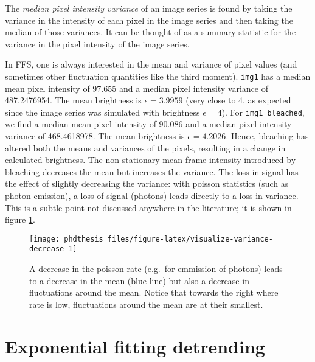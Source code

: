 \documentclass[12pt,]{book}
\theoremstyle{definition}
\theoremstyle{definition}
\theoremstyle{definition}
\theoremstyle{remark}
\let\BeginKnitrBlock\begin \let\EndKnitrBlock\end
\begin{document}
\BeginKnitrBlock{definition}[median pixel intensity variance]
\protect\hypertarget{def:unnamed-chunk-22}{}{\label{def:unnamed-chunk-22}
\iffalse (median pixel intensity variance) \fi{} }The \emph{median pixel
intensity variance} of an image series is found by taking the variance
in the intensity of each pixel in the image series and then taking the
median of those variances. It can be thought of as a summary statistic
for the variance in the pixel intensity of the image series.
\EndKnitrBlock{definition}

In FFS, one is always interested in the mean and variance of pixel
values (and sometimes other fluctuation quantities like the third
moment). \texttt{img1} has a median mean pixel intensity of 97.655 and a
median pixel intensity variance of 487.2476954. The mean brightness is
\(\epsilon = 3.9959\) (very close to 4, as expected since the image
series was simulated with brightness \(\epsilon = 4\)). For
\texttt{img1\_bleached}, we find a median mean pixel intensity of 90.086
and a median pixel intensity variance of 468.4618978. The mean
brightness is \(\epsilon = 4.2026\). Hence, bleaching has altered both
the means and variances of the pixels, resulting in a change in
calculated brightness. The non-stationary mean frame intensity
introduced by bleaching decreases the mean but increases the variance.
The loss in signal has the effect of slightly decreasing the variance:
with poisson statistics (such as photon-emission), a loss of signal
(photons) leads directly to a loss in variance. This is a subtle point
not discussed anywhere in the literature; it is shown in figure
\ref{fig:visualize-variance-decrease}.







\begin{figure}

\texttt{[image: phdthesis\_files/figure-latex/visualize-variance-decrease-1]} \hfill{}

\caption{A decrease in the poisson rate
(e.g.~for emmission of photons) leads to a decrease in the mean (blue
line) but also a decrease in fluctuations around the mean. Notice that
towards the right where rate is low, fluctuations around the mean are at
their smallest.}\label{fig:visualize-variance-decrease}
\end{figure}

\section{Exponential fitting
detrending}\label{exponential-fitting-detrending}
\end{document}
